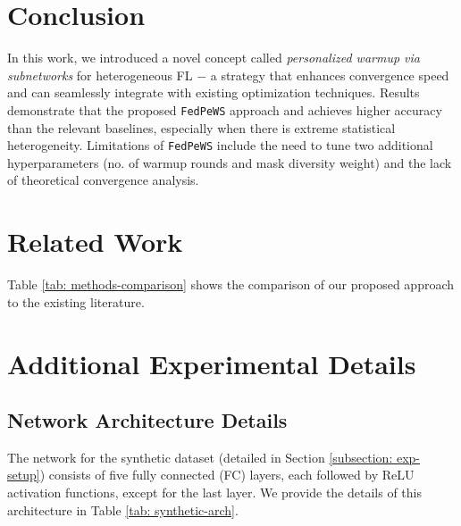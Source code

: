 \documentclass{article}
\begin{document}
\section{Conclusion} 
In this work, we introduced a novel concept called \textit{personalized warmup via subnetworks} for heterogeneous FL $-$ a strategy that enhances convergence speed and can seamlessly integrate with existing optimization techniques. Results demonstrate that the proposed \texttt{FedPeWS} approach and achieves higher accuracy than the relevant baselines, especially when there is extreme statistical heterogeneity. Limitations of \texttt{FedPeWS} include the need to tune two additional hyperparameters (no. of warmup rounds and mask diversity weight) and the lack of theoretical convergence analysis. 






\newpage
\appendix 
\section{Related Work}

Table \ref{tab: methods-comparison} shows the comparison of our proposed approach to the existing literature. 

 

\section{Additional Experimental Details} 
\label{suppl-section: arch} 

\subsection{Network Architecture Details} 
The network for the synthetic dataset (detailed in Section \ref{subsection: exp-setup}) consists of five fully connected (FC) layers, each followed by  ReLU activation functions, except for the last layer. We provide the details of this architecture in Table \ref{tab: synthetic-arch}. 

\begin{table}[th]
    \centering
    \caption{Architecture for synthetic dataset models used in the experiments.}
    \label{tab: synthetic-arch}
\end{table}
\end{document}
